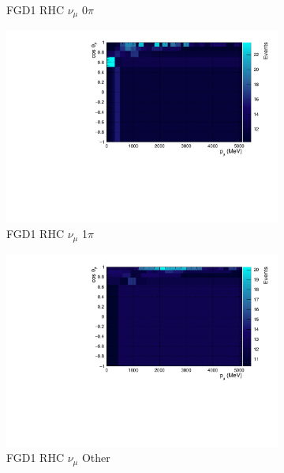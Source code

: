 \begin{figure}
\begin{subfigure}{.32\textwidth}
  \caption{FGD1 RHC $\nu_{\mu}$ 0$\pi$}
  \label{fig:th2polyFGD1_NuMuBkg_CC0pi_in_AntiNu_Mode}
\end{subfigure}
\begin{subfigure}{.32\textwidth}
  \centering
  \includegraphics[width=0.95\linewidth]{figs/TH2Poly_MC_FGD1_NuMuBkg_CC1pi_in_AntiNu_Mode}
  \caption{FGD1 RHC $\nu_{\mu}$ 1$\pi$}
  \label{fig:th2polyFGD1_NuMuBkg_CC1pi_in_AntiNu_Mode}
\end{subfigure}
\begin{subfigure}{.32\textwidth}
  \centering
  \includegraphics[width=0.95\linewidth]{figs/TH2Poly_MC_FGD1_NuMuBkg_CCOther_in_AntiNu_Mode}
  \caption{FGD1 RHC $\nu_{\mu}$ Other}
  \label{fig:th2polyFGD1_NuMuBkg_CCOther_in_AntiNu_Mode}
\end{subfigure}
\begin{subfigure}{.32\textwidth}
  \centering

\end{subfigure}
\end{figure}
